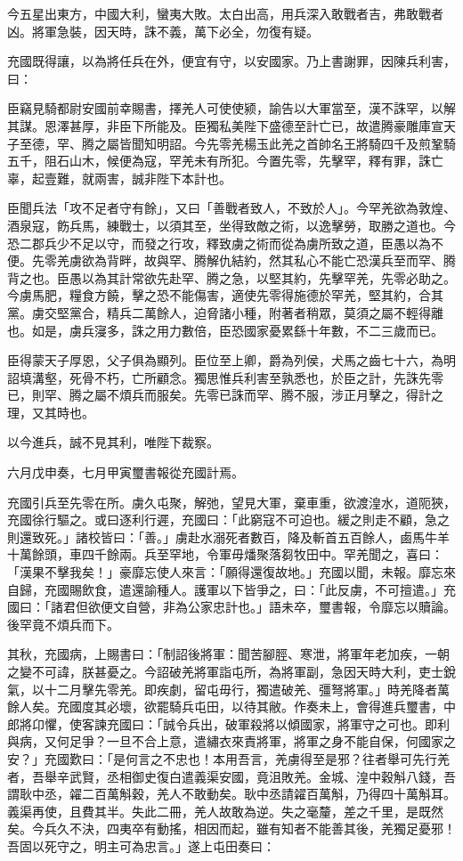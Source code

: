 \begin{pinyinscope}
今五星出東方，中國大利，蠻夷大敗。太白出高，用兵深入敢戰者吉，弗敢戰者凶。將軍急裝，因天時，誅不義，萬下必全，勿復有疑。

充國既得讓，以為將任兵在外，便宜有守，以安國家。乃上書謝罪，因陳兵利害，曰：

臣竊見騎都尉安國前幸賜書，擇羌人可使使颍，諭告以大軍當至，漢不誅罕，以解其謀。恩澤甚厚，非臣下所能及。臣獨私美陛下盛德至計亡已，故遣腾豪雕庫宣天子至德，罕、腾之屬皆聞知明詔。今先零羌楊玉此羌之首帥名王將騎四千及煎鞏騎五千，阻石山木，候便為寇，罕羌未有所犯。今置先零，先擊罕，釋有罪，誅亡辜，起壹難，就兩害，誠非陛下本計也。

臣聞兵法「攻不足者守有餘」，又曰「善戰者致人，不致於人」。今罕羌欲為敦煌、酒泉寇，飭兵馬，練戰士，以須其至，坐得致敵之術，以逸擊勞，取勝之道也。今恐二郡兵少不足以守，而發之行攻，釋致虜之術而從為虜所致之道，臣愚以為不便。先零羌虜欲為背畔，故與罕、腾解仇結約，然其私心不能亡恐漢兵至而罕、腾背之也。臣愚以為其計常欲先赴罕、腾之急，以堅其約，先擊罕羌，先零必助之。今虜馬肥，糧食方饒，擊之恐不能傷害，適使先零得施德於罕羌，堅其約，合其黨。虜交堅黨合，精兵二萬餘人，迫脅諸小種，附著者稍眾，莫須之屬不輕得離也。如是，虜兵寖多，誅之用力數倍，臣恐國家憂累繇十年數，不二三歲而已。

臣得蒙天子厚恩，父子俱為顯列。臣位至上卿，爵為列侯，犬馬之齒七十六，為明詔填溝壑，死骨不朽，亡所顧念。獨思惟兵利害至孰悉也，於臣之計，先誅先零已，則罕、腾之屬不煩兵而服矣。先零已誅而罕、腾不服，涉正月擊之，得計之理，又其時也。

以今進兵，誠不見其利，唯陛下裁察。

六月戊申奏，七月甲寅璽書報從充國計焉。

充國引兵至先零在所。虜久屯聚，解弛，望見大軍，棄車重，欲渡湟水，道阨狹，充國徐行驅之。或曰逐利行遲，充國曰：「此窮寇不可迫也。緩之則走不顧，急之則還致死。」諸校皆曰：「善。」虜赴水溺死者數百，降及斬首五百餘人，鹵馬牛羊十萬餘頭，車四千餘兩。兵至罕地，令軍毋燔聚落芻牧田中。罕羌聞之，喜曰：「漢果不擊我矣！」豪靡忘使人來言：「願得還復故地。」充國以聞，未報。靡忘來自歸，充國賜飲食，遣還諭種人。護軍以下皆爭之，曰：「此反虜，不可擅遣。」充國曰：「諸君但欲便文自營，非為公家忠計也。」語未卒，璽書報，令靡忘以贖論。後罕竟不煩兵而下。

其秋，充國病，上賜書曰：「制詔後將軍：聞苦腳脛、寒泄，將軍年老加疾，一朝之變不可諱，朕甚憂之。今詔破羌將軍詣屯所，為將軍副，急因天時大利，吏士銳氣，以十二月擊先零羌。即疾劇，留屯毋行，獨遣破羌、彊弩將軍。」時羌降者萬餘人矣。充國度其必壞，欲罷騎兵屯田，以待其敝。作奏未上，會得進兵璽書，中郎將卬懼，使客諫充國曰：「誠令兵出，破軍殺將以傾國家，將軍守之可也。即利與病，又何足爭？一旦不合上意，遣繡衣來責將軍，將軍之身不能自保，何國家之安？」充國歎曰：「是何言之不忠也！本用吾言，羌虜得至是邪？往者舉可先行羌者，吾舉辛武賢，丞相御史復白遣義渠安國，竟沮敗羌。金城、湟中穀斛八錢，吾謂耿中丞，糴二百萬斛穀，羌人不敢動矣。耿中丞請糴百萬斛，乃得四十萬斛耳。義渠再使，且費其半。失此二冊，羌人故敢為逆。失之毫釐，差之千里，是既然矣。今兵久不決，四夷卒有動搖，相因而起，雖有知者不能善其後，羌獨足憂邪！吾固以死守之，明主可為忠言。」遂上屯田奏曰：


\end{pinyinscope}
